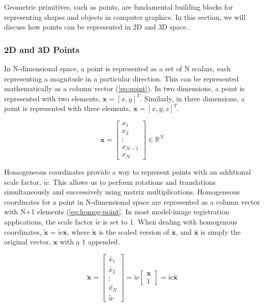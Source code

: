 Geometric primitives, such as points, are fundamental building blocks for representing shapes and objects in computer graphics. In this section, we will discuss how points can be represented in 2D and 3D space..

\subsubsection{2D and 3D Points}
\label{sec:geometric-points}
In N-dimensional space, a point is represented as a set of N scalars, each representing a magnitude in a particular direction. This can be represented mathematically as a column vector (\cref{eq:point}). In two dimensions, a point is represented with two elements, $\mathbf{x} = [x , y]^{T}$. Similarly, in three dimensions, a point is represented with three elements, $\mathbf{x} = [x , y , z]^{T}$.

\begin{equation}
    \mathbf{x} = \begin{bmatrix}
        x_1 \\ x_2 \\ \vdots \\ x_{N-1} \\ x_N
    \end{bmatrix} \in \mathbb{R}^N
    \label{eq:point}
\end{equation}

Homogeneous coordinates provide a way to represent points with an additional scale factor, $\tilde{w}$. This allows us to perform rotations and translations simultaneously and successively using matrix multiplications. Homogeneous coordinates for a point in N-dimensional space are represented as a column vector with N+1 elements (\cref{eq:homog-point}. In most model-image registration applications, the scale factor $\tilde{w}$ is set to 1. When dealing with homogenous coordinates, $\mathbf{\tilde{x}} = \tilde{w}\mathbf{\bar{x}}$, where $\mathbf{\tilde{x}}$ is the scaled version of $\bar{\mathbf{x}}$, and $\bar{\mathbf{x}}$ is simply the original vector, $\mathbf{x}$ with a $1$ appended.

\begin{equation}
    \tilde{\mathbf{x}} = \begin{bmatrix}
        \tilde{x_1} \\ \tilde{x_2} \\ \vdots \\ \tilde{x_N} \\ \tilde{w}
    \end{bmatrix} = \tilde{w}\begin{bmatrix}
        \mathbf{x}\\ 1
    \end{bmatrix} = \tilde{w}\bar{\mathbf{x}}
    \label{eq:homog-point}
\end{equation}

